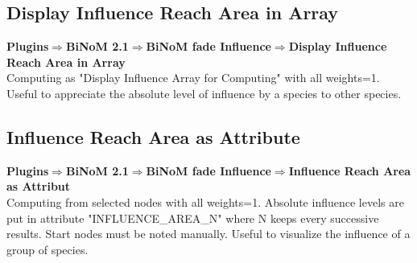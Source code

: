 \subsection{Display Influence Reach Area in Array}
\textbf{Plugins$\Rightarrow$BiNoM 2.1$\Rightarrow$BiNoM fade Influence$\Rightarrow$Display Influence Reach Area in Array}\\
Computing as "Display Influence Array for Computing" with all weights=1. Useful to appreciate the absolute level of influence by a species to other species.

\subsection{Influence Reach Area as Attribute}
\textbf{Plugins$\Rightarrow$BiNoM 2.1$\Rightarrow$BiNoM fade Influence$\Rightarrow$Influence Reach Area as Attribut}\\
Computing from selected nodes with all weights=1. Absolute influence levels are put in attribute "INFLUENCE\_AREA\_N" where N keeps every successive results. Start nodes must be noted manually. Useful to visualize the influence of a group of species.
